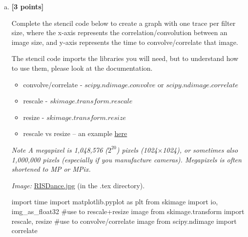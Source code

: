 \documentclass[11pt]{article}
\begin{document}
\begin{enumerate}[(a)]
\item
    \textbf{[3 points]}
    \begin{tcolorbox}[colback=orange!5!white,colframe=orange!75!black]
    Complete the stencil code below to create a graph with one trace per filter size, where the x-axis represents the correlation/convolution between an image size, and y-axis represents the time to convolve/correlate that image.

    The stencil code imports the libraries you will need, but to understand how to use them, please look at the documentation.
    
    \begin{itemize}
    \item convolve/correlate - \href{https://docs.scipy.org/doc/scipy/reference/generated/scipy.ndimage.convolve.html}{$scipy.ndimage.convolve$} or \href{https://docs.scipy.org/doc/scipy/reference/generated/scipy.ndimage.correlate.html}{$scipy.ndimage.correlate$}
    \item rescale - \href{https://scikit-image.org/docs/dev/api/skimage.transform.html#skimage.transform.rescale}{$skimage.transform.rescale$}
    \item resize - \href{https://scikit-image.org/docs/dev/api/skimage.transform.html#skimage.transform.resize}{$skimage.transform.resize$}
    \item rescale vs resize – an example \href{http://scikit-image.org/docs/dev/auto_examples/transform/plot_rescale.html}{here}
    \end{itemize}
    
    \end{tcolorbox}

\emph{Note A megapixel is 1,048,576 ($2^{20}$) pixels (1024$\times$1024), or sometimes also 1,000,000 pixels (especially if you manufacture cameras). Megapixels is often shortened to MP or MPix.}

\emph{Image:} \href{RISDance.jpg}{RISDance.jpg} (in the .tex directory).

\begin{tcolorbox}[enhanced jigsaw,breakable,pad at break*=1mm,colback=white!5!white,colframe=green!75!black,height fixed for=all]

\begin{python}
import time
import matplotlib.pyplot as plt
from skimage import io, img_as_float32
#use to rescale+resize image
from skimage.transform import rescale, resize
#use to convolve/correlate image
from scipy.ndimage import correlate


\end{python}
\end{tcolorbox}
\end{enumerate}
\end{document}
